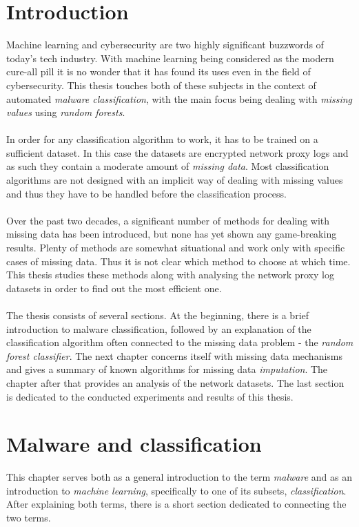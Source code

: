 \documentclass[11pt]{article}
\begin{document}
  \section*{Introduction}
    Machine learning and cybersecurity are two highly significant buzzwords of today's tech industry. With machine learning being considered as the modern cure-all pill it is no wonder that it has found its uses even in the field of cybersecurity. This thesis touches both of these subjects in the context of automated {\it malware classification}, with the main focus being dealing with {\it missing values} using {\it random forests}.
    \\~\\
    In order for any classification algorithm to work, it has to be trained on a sufficient dataset. In this case the datasets are encrypted network proxy logs and as such they contain a moderate amount of {\it missing data}. Most classification algorithms are not designed with an implicit way of dealing with missing values and thus they have to be handled before the classification process.
    \\~\\
    Over the past two decades, a significant number of methods for dealing with missing data has been introduced, but none has yet shown any game-breaking results. Plenty of methods are somewhat situational and work only with specific cases of missing data. Thus it is not clear which method to choose at which time. This thesis studies these methods along with analysing the network proxy log datasets in order to find out the most efficient one.
    \\~\\
    The thesis consists of several sections. At the beginning, there is a brief introduction to malware classification, followed by an explanation of the classification algorithm often connected to the missing data problem - the {\it random forest classifier}. The next chapter concerns itself with missing data mechanisms and gives a summary of known algorithms for missing data {\it imputation}. The chapter after that provides an analysis of the network datasets. The last section is dedicated to the conducted experiments and results of this thesis.
  \newpage
  \section{Malware and classification}
      This chapter serves both as a general introduction to the term {\it malware} and as an introduction to {\it machine learning}, specifically to one of its subsets, {\it classification}. After explaining both terms, there is a short section dedicated to connecting the two terms.
\end{document}
